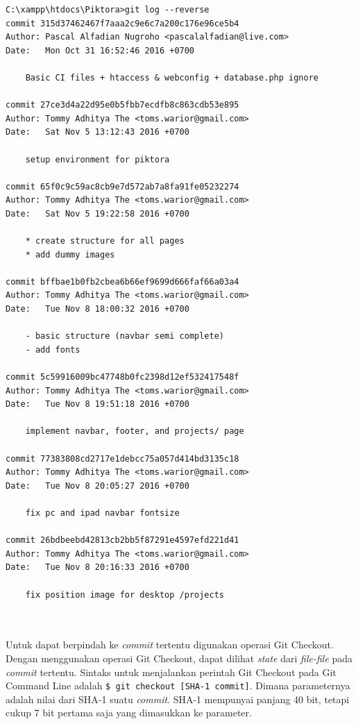 \begin{lstlisting}[caption={Histori \textit{commit} pada proyek Piktora, ditampilkan dengan urutan \textit{commit} terlama},label={lst:commit_history_piktora_reverse},language=plaintext]
C:\xampp\htdocs\Piktora>git log --reverse
commit 315d37462467f7aaa2c9e6c7a200c176e96ce5b4
Author: Pascal Alfadian Nugroho <pascalalfadian@live.com>
Date:   Mon Oct 31 16:52:46 2016 +0700

    Basic CI files + htaccess & webconfig + database.php ignore

commit 27ce3d4a22d95e0b5fbb7ecdfb8c863cdb53e895
Author: Tommy Adhitya The <toms.warior@gmail.com>
Date:   Sat Nov 5 13:12:43 2016 +0700

    setup environment for piktora

commit 65f0c9c59ac8cb9e7d572ab7a8fa91fe05232274
Author: Tommy Adhitya The <toms.warior@gmail.com>
Date:   Sat Nov 5 19:22:58 2016 +0700

    * create structure for all pages
    * add dummy images

commit bffbae1b0fb2cbea6b66ef9699d666faf66a03a4
Author: Tommy Adhitya The <toms.warior@gmail.com>
Date:   Tue Nov 8 18:00:32 2016 +0700

    - basic structure (navbar semi complete)
    - add fonts

commit 5c59916009bc47748b0fc2398d12ef532417548f
Author: Tommy Adhitya The <toms.warior@gmail.com>
Date:   Tue Nov 8 19:51:18 2016 +0700

    implement navbar, footer, and projects/ page

commit 77383808cd2717e1debcc75a057d414bd3135c18
Author: Tommy Adhitya The <toms.warior@gmail.com>
Date:   Tue Nov 8 20:05:27 2016 +0700

    fix pc and ipad navbar fontsize

commit 26bdbeebd42813cb2bb5f87291e4597efd221d41
Author: Tommy Adhitya The <toms.warior@gmail.com>
Date:   Tue Nov 8 20:16:33 2016 +0700

    fix position image for desktop /projects
    
\end{lstlisting}
\ \\
Untuk dapat berpindah ke \textit{commit} tertentu digunakan operasi Git Checkout. Dengan menggunakan operasi Git Checkout, dapat dilihat \textit{state} dari \textit{file-file} pada \textit{commit} tertentu. Sintaks untuk menjalankan perintah Git Checkout pada Git Command Line adalah \texttt{\$ git checkout [SHA-1 commit]}. Dimana parameternya adalah nilai dari SHA-1 suatu \textit{commit}. SHA-1 mempunyai panjang 40 bit, tetapi cukup 7 bit pertama saja yang dimasukkan ke parameter.

